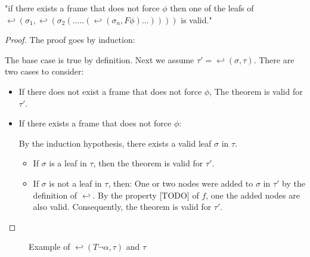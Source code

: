 \documentclass[runningheads]{llncs}
\begin{document}
\begin{theorem}
    "if there exists a frame that does not force $\phi$ then one of the leafs of $ \hookleftarrow (\sigma_1,\hookleftarrow(\sigma_2(.....(\hookleftarrow(\sigma_n , F\phi)...)))) $ is valid."
\end{theorem}

\begin{proof}

    The proof goes by induction:


             The base case is true by definition. Next we assume $\tau' = \hookleftarrow (\sigma, \tau)$.
             There are two cases to consider:
            \begin{itemize}
                \item If there does not exist a frame that does not force $\phi$, The theorem is valid for $\tau'$.
                \item  If there exists a frame that does not force $\phi$:

                         By the induction hypothesis, there exists a valid leaf $\sigma$ in $\tau$.
                         \begin{itemize}
                    \item If $\sigma$ is a leaf in $\tau$, then the theorem is valid for $\tau'$.
                    \item If $\sigma$ is not a leaf in $\tau$, then:
                         One or two nodes were added to $\sigma$ in $\tau'$ by the definition of $\hookleftarrow$.
                         By the property [TODO] of $f$, one the added nodes are also valid.
                         Consequently, the theorem is valid for $\tau'$.

            \end{itemize}
            \end{itemize}
    \end{proof}
\begin{figure}
\centering
{}
\caption{Example of $\hookleftarrow(T \neg \alpha ,\tau)$ and $\tau$ } 
\label{fig:tree_expansion}
\end{figure}
\end{document}
